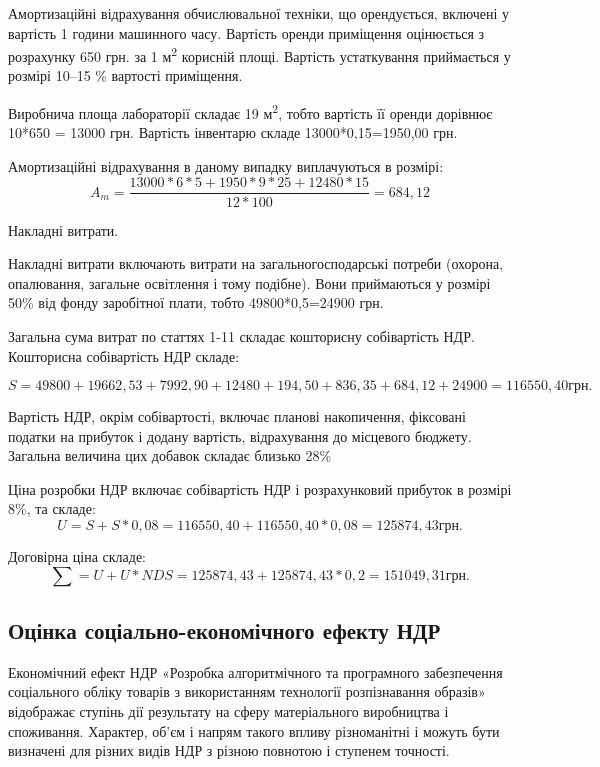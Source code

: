 Амортизаційні відрахування обчислювальної техніки, що орендується, включені у вартість 1 години машинного часу. Вартість оренди приміщення оцінюється з розрахунку 650 грн. за 1 м\textsuperscript{2} корисній площі. Вартість устаткування приймається у розмірі 10--15 \% вартості приміщення. 

Виробнича площа лабораторії складає 19 м\textsuperscript{2}, тобто вартість її оренди дорівнює 10*650 = 13000 грн. Вартість інвентарю складе 13000*0,15=1950,00 грн.

Амортизаційні відрахування в даному випадку виплачуються в розмірі:
\begin{equation}
A_m = \frac{13000*6*5+1950*9*25+12480*15}{12*100} = 684,12
\end{equation}

Накладні витрати.

Накладні витрати включають витрати на загальногосподарські потреби (охорона, опалювання, загальне освітлення і тому подібне). Вони приймаються у розмірі 50\% від фонду заробітної плати, тобто 49800*0,5=24900 грн. 

Загальна сума витрат по статтях 1-11 складає кошторисну собівартість НДР. Кошторисна собівартість НДР складе:

\begin{equation}
S = 49800+19662,53+7992,90+12480+194,50+836,35+684,12+24900 = 116550,40 грн.
\end{equation}

Вартість НДР, окрім собівартості, включає планові накопичення, фіксовані податки на прибуток і додану вартість, відрахування до місцевого бюджету. Загальна величина цих добавок складає близько 28\%

Ціна розробки НДР включає собівартість НДР і розрахунковий прибуток в розмірі 8\%, та складе:
\begin{equation}
U=S+S*0,08= 116550,40+116550,40*0,08=125874,43 грн.
\end{equation}

Договірна ціна складе: 
\begin{equation}
\sum = U + U * NDS = 125874,43+125874,43*0,2=151049,31 грн. 
\end{equation}

\subsection{Оцінка соціально-економічного ефекту НДР}
Економічний ефект НДР «Розробка алгоритмічного та програмного забезпечення соціального обліку товарів з використанням технології розпізнавання образів» відображає ступінь дії результату на сферу матеріального виробництва і споживання. Характер, об'єм і напрям такого впливу різноманітні і можуть бути визначені для різних видів НДР з різною повнотою і ступенем точності.

